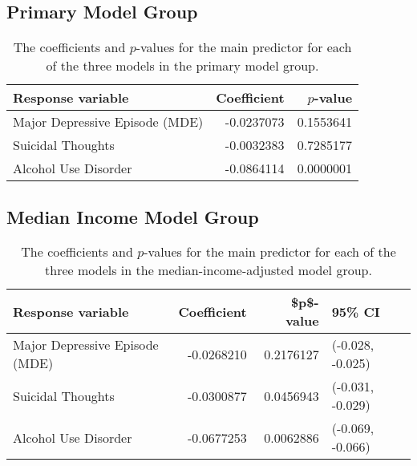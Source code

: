 \documentclass{article}
\begin{document}
\subsection{Primary Model Group}

\begin{table}[!htb]
\begin{center}
\begin{tabular}{l r r}
    \hline
    Response variable & Coefficient & $p$-value\\
    \hline
    Major Depressive Episode (MDE) & -0.0237073 & 0.1553641\\
    Suicidal Thoughts & -0.0032383 & 0.7285177\\
    Alcohol Use Disorder & -0.0864114 & 0.0000001\\
    \hline
\end{tabular}
\caption{\label{tab:primary-model-results} The coefficients and $p$-values
    for the main predictor for each of the three models
    in the primary model group.
}
\end{center}
\end{table}

\subsection{Median Income Model Group}

\begin{table}[!htb]
\begin{center}
\begin{tabular}{l r r l}
    \hline
    Response variable & Coefficient & \$p\$-value & 95\% CI\\
    \hline
    Major Depressive Episode (MDE) & -0.0268210 & 0.2176127 & (-0.028, -0.025)\\
    \hline
    Suicidal Thoughts & -0.0300877 & 0.0456943 & (-0.031, -0.029)\\
    \hline
    Alcohol Use Disorder & -0.0677253 & 0.0062886 & (-0.069, -0.066)\\
    \hline
\end{tabular}
\caption{\label{tab:median-income-model-results} The coefficients and $p$-values
    for the main predictor for each of the three models
    in the median-income-adjusted model group.
}
\end{center}
\end{table}
\end{document}
